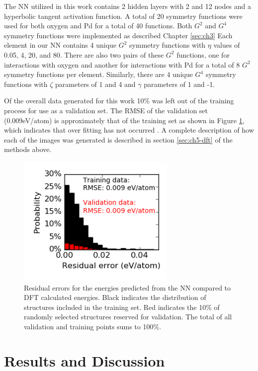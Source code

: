 \documentclass[12pt]{cmuthesis}
\begin{document}
The NN utilized in this work contains 2 hidden layers with 2 and 12 nodes and a hyperbolic tangent activation function. A total of 20 symmetry functions were used for both oxygen and Pd for a total of 40 functions. Both \(G^{2}\) and \(G^{4}\) symmetry functions were implemented as described Chapter \ref{sec:ch3} Each element in our NN contains 4 unique \(G^{2}\) symmetry functions with \(\eta\) values of 0.05, 4, 20, and 80. There are also two pairs of these \(G^{2}\) functions, one for interactions with oxygen and another for interactions with Pd for a total of 8 \(G^{2}\) symmetry functions per element. Similarly, there are 4 unique \(G^{4}\) symmetry functions with \(\zeta\) parameters of 1 and 4 and \(\gamma\) parameters of 1 and -1.

Of the overall data generated for this work 10\% was left out of the training process for use as a validation set. The RMSE of the validation set (0.009eV/atom) is approximately that of the training set as shown in Figure \ref{fig-residuals}, which indicates that over fitting has not occurred \cite{behler-2015-const}. A complete description of how each of the images was generated is described in section \ref{sec:ch5-dft} of the methods above.

\begin{figure}[htbp]
\centering
\includegraphics[width=3in]{./images/distribution.png}
\caption{\label{fig-residuals}
Residual errors for the energies predicted from the NN compared to DFT calculated energies. Black indicates the distribution of structures included in the training set. Red indicates the 10\% of randomly selected structures reserved for validation. The total of all validation and training points sums to 100\%.}
\end{figure}

\section{Results and Discussion}
\label{sec:org7a992e6}
\end{document}
